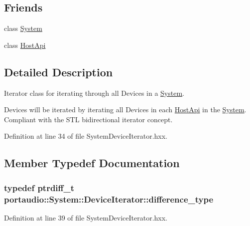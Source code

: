 \subsection*{Friends}
\begin{DoxyCompactItemize}
\item 
class \hyperlink{classportaudio_1_1_system_1_1_device_iterator_af18a9ee98e70982bfe2975391d7221a5}{System}
\item 
class \hyperlink{classportaudio_1_1_system_1_1_device_iterator_a711915ab08cef70dfff5040953063ef2}{Host\+Api}
\end{DoxyCompactItemize}


\subsection{Detailed Description}
Iterator class for iterating through all Devices in a \hyperlink{classportaudio_1_1_system}{System}. 

Devices will be iterated by iterating all Devices in each \hyperlink{classportaudio_1_1_host_api}{Host\+Api} in the \hyperlink{classportaudio_1_1_system}{System}. Compliant with the S\+TL bidirectional iterator concept. 

Definition at line 34 of file System\+Device\+Iterator.\+hxx.



\subsection{Member Typedef Documentation}
\subsubsection[{\texorpdfstring{difference\+\_\+type}{difference_type}}]{\setlength{\rightskip}{0pt plus 5cm}typedef ptrdiff\+\_\+t {\bf portaudio\+::\+System\+::\+Device\+Iterator\+::difference\+\_\+type}}\hypertarget{classportaudio_1_1_system_1_1_device_iterator_a249b0344098059e35dc0340b20879bf4}{}\label{classportaudio_1_1_system_1_1_device_iterator_a249b0344098059e35dc0340b20879bf4}


Definition at line 39 of file System\+Device\+Iterator.\+hxx.

